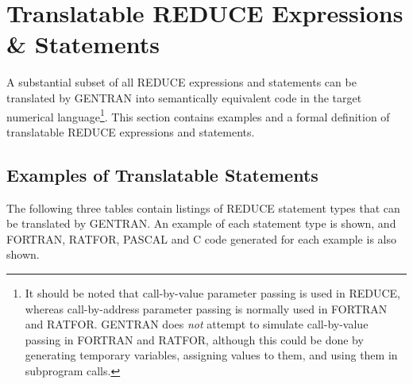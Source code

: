 \section{Translatable REDUCE Expressions \& Statements}
\label{appa}
A substantial subset of all REDUCE expressions and statements
can be translated by GENTRAN into semantically equivalent code
in the target numerical language\footnote{
It should be noted that call-by-value parameter passing is used
in REDUCE, whereas call-by-address parameter passing is normally
used in FORTRAN and RATFOR.  GENTRAN does {\it not} attempt
to simulate call-by-value passing in FORTRAN and RATFOR, although
this could be done by generating temporary variables, assigning
values to them, and using them in subprogram calls.
 }. This
section contains examples and a formal definition of translatable REDUCE
expressions and statements.

\subsection{Examples of Translatable Statements}
The following three tables contain listings of REDUCE statement types
that can be translated by GENTRAN.  An example of each statement
type is shown, and FORTRAN, RATFOR, PASCAL and C code generated for each
example is also shown.

